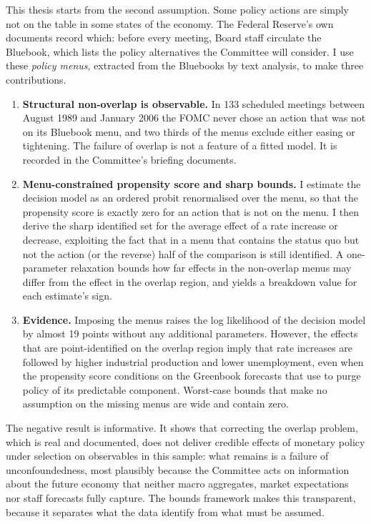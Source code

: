 This thesis starts from the second assumption. Some policy actions are simply not on the table in some states
of the economy. The Federal Reserve's own documents record which: before every meeting, Board staff circulate the
Bluebook, which lists the policy alternatives the Committee will consider. I use these \emph{policy menus},
extracted from the Bluebooks by text analysis, to make three contributions.
\begin{enumerate}[leftmargin=*,itemsep=2pt]
  \item \textbf{Structural non-overlap is observable.} In 133 scheduled meetings between August 1989 and
  January 2006 the FOMC never chose an action that was not on its Bluebook menu, and two thirds of the menus exclude
  either easing or tightening. The failure of overlap is not a feature of a fitted model. It is recorded in
  the Committee's briefing documents.
  \item \textbf{Menu-constrained propensity score and sharp bounds.} I estimate the decision model as an
  ordered probit renormalised over the menu, so that the propensity score is exactly zero for an action that is
  not on the menu. I then derive the sharp identified set for the average effect of a rate increase or decrease,
  exploiting the fact that in a menu that contains the status quo but not the action (or the reverse) half of
  the comparison is still identified. A one-parameter relaxation bounds how far effects in the non-overlap menus
  may differ from the effect in the overlap region, and yields a breakdown value for each estimate's sign.
  \item \textbf{Evidence.} Imposing the menus raises the log likelihood of the decision model by almost 19 points
  without any additional parameters. However, the effects that are point-identified on the overlap region imply that
  rate increases are followed by higher industrial production and lower unemployment, even when the propensity
  score conditions on the Greenbook forecasts that \citet{romer2004} use to purge policy of its predictable
  component. Worst-case bounds that make no assumption on the missing menus are wide and contain zero.
\end{enumerate}

The negative result is informative. It shows that correcting the overlap problem, which is real and
documented, does not deliver credible effects of monetary policy under selection on observables in this sample:
what remains is a failure of unconfoundedness, most plausibly because the Committee acts on information about the
future economy that neither macro aggregates, market expectations nor staff forecasts fully capture. The bounds
framework makes this transparent, because it separates what the data identify from what must be assumed.

